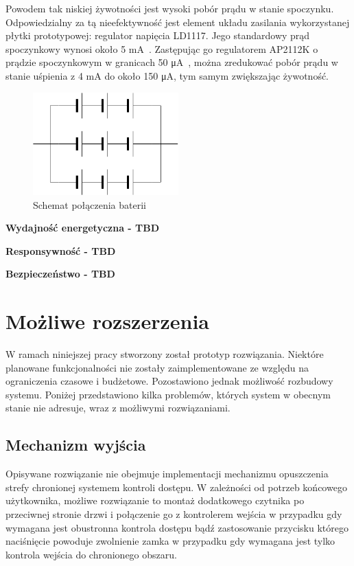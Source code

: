         Powodem tak niskiej żywotności jest wysoki pobór prądu w stanie spoczynku. Odpowiedzialny za tą nieefektywność jest element układu zasilania wykorzystanej płytki prototypowej: regulator napięcia LD1117. Jego standardowy prąd spoczynkowy wynosi około 5 mA~\cite{AMS1117-ds}. Zastępując go regulatorem AP2112K o prądzie spoczynkowym w granicach 50 μA~\cite{AP2112K-ds}, można zredukować pobór prądu w stanie uśpienia z 4 mA do około 150 μA, tym samym zwiększając żywotność.

        \begin{figure}[]
            \centering
            \includegraphics[width=0.5\textwidth]{chapters/images/battery_layout.png}
            \caption{Schemat połączenia baterii}
            \label{fig:battery_layout}
        \end{figure}


	\textbf{Wydajność energetyczna - TBD}

	\textbf{Responsywność - TBD}

	\textbf{Bezpieczeństwo - TBD}

	\section{Możliwe rozszerzenia}

        W ramach niniejszej pracy stworzony został prototyp rozwiązania. Niektóre planowane funkcjonalności nie zostały zaimplementowane ze względu na ograniczenia czasowe i budżetowe. Pozostawiono jednak możliwość rozbudowy systemu. Poniżej przedstawiono kilka problemów, których system w obecnym stanie nie adresuje, wraz z możliwymi rozwiązaniami.

        \subsection{Mechanizm wyjścia}

            Opisywane rozwiązanie nie obejmuje implementacji mechanizmu opuszczenia strefy chronionej systemem kontroli dostępu. W zależności od potrzeb końcowego użytkownika, możliwe rozwiązanie to montaż dodatkowego czytnika po przeciwnej stronie drzwi i połączenie go z kontrolerem wejścia w przypadku gdy wymagana jest obustronna kontrola dostępu bądź zastosowanie przycisku którego naciśnięcie powoduje zwolnienie zamka w przypadku gdy wymagana jest tylko kontrola wejścia do chronionego obszaru.

